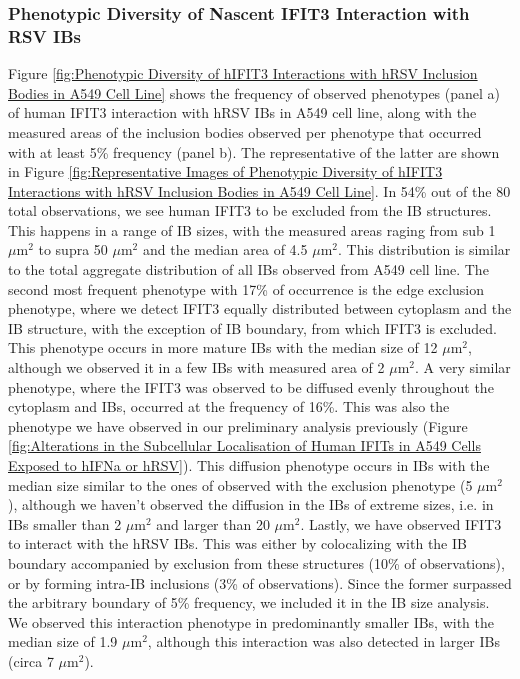 \subsubsection{Phenotypic Diversity of Nascent IFIT3 Interaction with RSV IBs}
Figure \ref{fig:Phenotypic Diversity of hIFIT3 Interactions with hRSV Inclusion Bodies in A549 Cell Line} shows the frequency of observed phenotypes (panel a) of human IFIT3 interaction with hRSV IBs in A549 cell line, along with the measured areas of the inclusion bodies observed per phenotype that occurred with at least 5\% frequency (panel b). The representative of the latter are shown in Figure \ref{fig:Representative Images of Phenotypic Diversity of hIFIT3 Interactions with hRSV Inclusion Bodies in A549 Cell Line}. In 54\% out of the 80 total observations, we see human IFIT3 to be excluded from the IB structures. This happens in a range of IB sizes, with the measured areas raging from sub 1 \(\mu \mbox{m}^2\) to supra 50 \(\mu \mbox{m}^2\) and the median area of 4.5 \(\mu \mbox{m}^2\). This distribution is similar to the total aggregate distribution of all IBs observed from A549 cell line. The second most frequent phenotype with 17\% of occurrence is the edge exclusion phenotype, where we detect IFIT3 equally distributed between cytoplasm and the IB structure, with the exception of IB boundary, from which IFIT3 is excluded. This phenotype occurs in more mature IBs with the median size of 12 \(\mu \mbox{m}^2\), although we observed it in a few IBs with measured area of 2 \(\mu \mbox{m}^2\). A very similar phenotype, where the IFIT3 was observed to be diffused evenly throughout the cytoplasm and IBs, occurred at the frequency of 16\%. This was also the phenotype we have observed in our preliminary analysis previously (Figure \ref{fig:Alterations in the Subcellular Localisation of Human IFITs in A549 Cells Exposed to hIFNa or hRSV}). This diffusion phenotype occurs in IBs with the median size similar to the ones of observed with the exclusion phenotype (5 \(\mu \mbox{m}^2\)), although we haven't observed the diffusion in the IBs of extreme sizes, i.e. in IBs smaller than 2 \(\mu \mbox{m}^2\) and larger than 20 \(\mu \mbox{m}^2\). Lastly, we have observed IFIT3 to interact with the hRSV IBs. This was either by colocalizing with the IB boundary accompanied by exclusion from these structures (10\% of observations), or by forming intra-IB inclusions (3\% of observations). Since the former surpassed the arbitrary boundary of 5\% frequency, we included it in the IB size analysis. We observed this interaction phenotype in predominantly smaller IBs, with the median size of 1.9 \(\mu \mbox{m}^2\), although this interaction was also detected in larger IBs (circa 7 \(\mu \mbox{m}^2\)).

